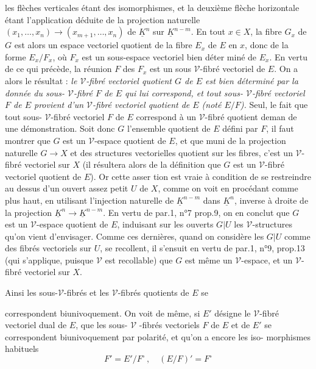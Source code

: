 
les flèches verticales étant des isomorphismes, et la deuxième flèche
horizontale étant l'application déduite de la projection naturelle
$(x_1, \dots, x_n) \to (x_{m+1}, \dots, x_n)$ de $\underline{K}^n$ sur $\underline{K}^{n-m}$. En tout $x \in X$, la fibre
$G_x$ de $G$ est alors un espace vectoriel quotient de la fibre $E_x$ de $E$ en $x$,
donc de la forme $E_x/F_x$, où $F_x$ est un sous-espace vectoriel bien déter
miné de $E_x$. En vertu de ce qui précède, la réunion $F$ des $F_x$ est un sous
$\mathcal{V}$-fibré vectoriel de $E$. On a alors le résultat : \emph{le $\mathcal{V}$-fibré vectoriel
quotient $G$ de $E$ est bien déterminé par la donnée du sous- $\mathcal{V}$-fibré $F$ de
$E$ qui lui correspond, et tout sous- $\mathcal{V}$-fibré vectoriel $F$ de $E$ provient
d'un $\mathcal{V}$-fibré vectoriel quotient de $E$ (noté $E/F$).} Seul, le fait que tout
sous- $\mathcal{V}$-fibré vectoriel $F$ de $E$ correspond à un $\mathcal{V}$-fibré quotient deman
de une démonstration. Soit donc $G$ l'ensemble quotient de $E$ défini par $F$,
il faut montrer que $G$ est un $\mathcal{V}$-espace quotient de $E$, et que muni de la
projection naturelle $G \to X$ et des structures vectorielles quotient sur
les fibres, c'est un $\mathcal{V}$-fibré vectoriel sur $X$ (il résultera alors de la
définition que $G$ est un $\mathcal{V}$-fibré vectoriel quotient de $E$). Or cette asser
tion est vraie à condition de se restreindre au dessus d'un ouvert
assez petit $U$ de $X$, comme on voit en procédant comme plus haut, en
utilisant l'injection naturelle de $\underline{K}^{n-m}$ dans $\underline{K}^n$, inverse à droite de la
projection $\underline{K}^n \to \underline{K}^{n-m}$. En vertu de par.1, n°7 prop.9, on en conclut que
$G$ est un $\mathcal{V}$-espace quotient de $E$, induisant sur les ouverts $G|U$ les
$\mathcal{V}$-structures qu'on vient d'envisager. Comme ces dernières, quand on
considère les $G|U$ comme des fibrés vectoriels sur $U$, se recollent, il
s'ensuit en vertu de par.1, n°9, prop.13 (qui s'applique, puisque $\mathcal{V}$ est
recollable) que $G$ est même un $\mathcal{V}$-espace, et un $\mathcal{V}$-fibré vectoriel sur $X$.

Ainsi les sous-$\mathcal{V}$-fibrés et les $\mathcal{V}$-fibrés quotients de $E$ se

\newpage



correspondent biunivoquement. On voit de même, si $E'$ désigne le $\mathcal{V}$-fibré
vectoriel dual de $E$, que les sous- $\mathcal{V}$ -fibrés vectoriels $F$ de $E$ et de $E'$
se correspondent biunivoquement par polarité, et qu'on a encore les iso-
morphismes habituels
$$F' = E'/F^\circ \, , \quad (E/F)' = F^\circ$$

